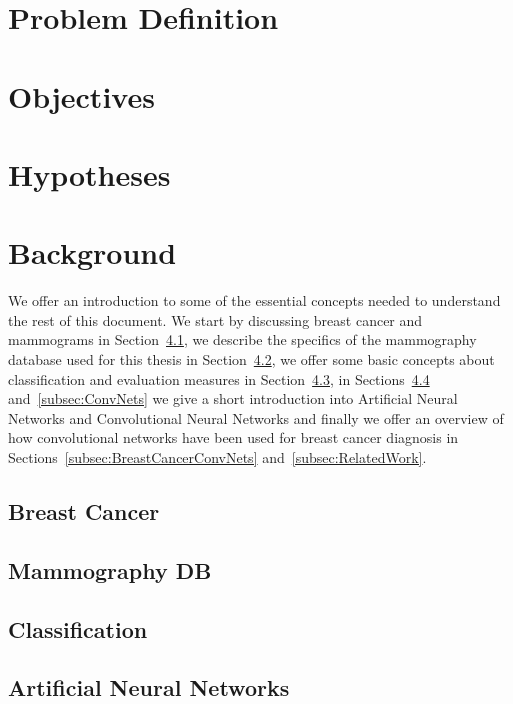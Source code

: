 \documentclass[11pt]{article}
\begin{document}
\section{Problem Definition}


\section{Objectives}


\section{Hypotheses}


\section{Background}
We offer an introduction to some of the essential concepts needed to understand the rest of this document. We start by discussing breast cancer and mammograms in Section~\ref{subsec:BreastCancer}, we describe the specifics of the mammography database used for this thesis in Section~\ref{subsec:MammographyDB}, we offer some basic concepts about classification and evaluation measures in Section~\ref{subsec:Classification}, in Sections~\ref{subsec:ANNs} and~\ref{subsec:ConvNets} we give a short introduction into Artificial Neural Networks and Convolutional Neural Networks and finally we offer an overview of how convolutional networks have been used for breast cancer diagnosis in Sections~\ref{subsec:BreastCancerConvNets} and~\ref{subsec:RelatedWork}.

	\subsection{Breast Cancer}
	\label{subsec:BreastCancer}
	

	\subsection{Mammography DB}
	\label{subsec:MammographyDB}

	\subsection{Classification}
	\label{subsec:Classification}
	

	\subsection{Artificial Neural Networks}
	\label{subsec:ANNs}
\end{document}
